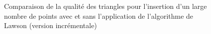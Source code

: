 \begin{figure}[h!]
	
	\caption{Comparaison de la qualité des triangles pour l'insertion d'un large nombre de points avec et sans l'application de l'algorithme de Lawson (version incrémentale)}
\end{figure}
\FloatBarrier